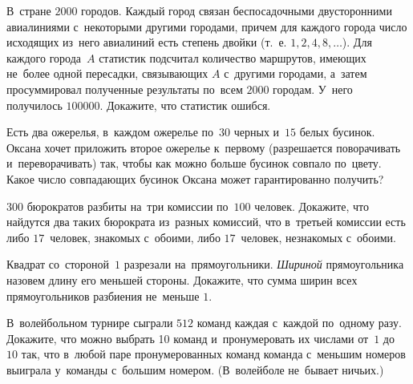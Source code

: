 \begin{problems}
\item
В~стране $2000$ городов.
Каждый город связан беспосадочными двусторонними авиалиниями с~некоторыми
другими городами, причем для каждого города число исходящих из~него авиалиний
есть степень двойки (т.~е. $1, 2, 4, 8, \ldots$). %
Для каждого города~$A$ статистик подсчитал количество маршрутов, имеющих
не~более одной пересадки, связывающих $A$ с~другими городами, а~затем
просуммировал полученные результаты по~всем $2000$ городам.
У~него получилось $100000$.
Докажите, что статистик ошибся.

\item
Есть два ожерелья, в~каждом ожерелье по~$30$ черных и~$15$ белых бусинок.
Оксана хочет приложить второе ожерелье к~первому (разрешается поворачивать
и~переворачивать) так, чтобы как можно больше бусинок совпало по~цвету.
Какое число совпадающих бусинок Оксана может гарантированно получить?

\item
$300$ бюрократов разбиты на~три комиссии по~$100$ человек.
Докажите, что найдутся два таких бюрократа из~разных комиссий, что в~третьей
комиссии есть либо $17$~человек, знакомых с~обоими, либо $17$~человек,
незнакомых с~обоими.

\item
Квадрат со~стороной~$1$ разрезали на~прямоугольники.
\emph{Шириной} прямоугольника назовем длину его меньшей стороны.
Докажите, что сумма ширин всех прямоугольников разбиения не~меньше $1$.

\item
В~волейбольном турнире сыграли $512$ команд каждая с~каждой по~одному разу.
Докажите, что можно выбрать 10 команд и~пронумеровать их числами от~$1$ до~$10$
так, что в~любой паре пронумерованных команд команда с~меньшим номеров выиграла
у~команды с~большим номером.
(В~волейболе не~бывает ничьих.)

\end{problems}

\endgroup %

